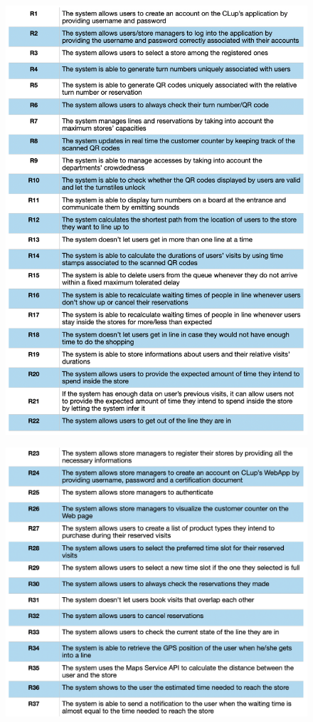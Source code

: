 \documentclass{article}
\begin{document}
\begin{figure}[H]
  \includegraphics[width=\linewidth]{Requirements1 copia.png}
  
\end{figure}

\begin{figure}[H]
  \includegraphics[width=\linewidth]{Requirements2 copia.png}
  
\end{figure}
\end{document}
